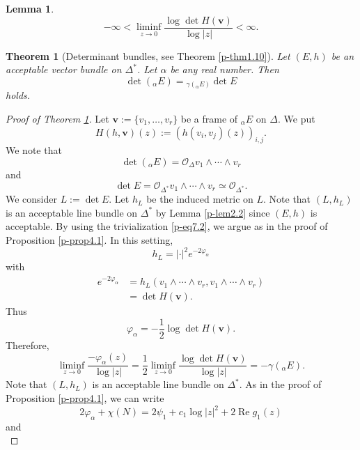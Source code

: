 \documentclass[10pt,a4paper]{amsart}
\newtheorem{thm}{Theorem}
\newtheorem{lem}{Lemma}
\DeclareMathOperator{\re}{Re}
\begin{document}
\begin{lem}\label{p-lem7.3}
\[
-\infty<\liminf _{z\to 0} \frac{\log \det H(\bm v)}{\log |z|}<\infty. 
\]
\end{lem}

\begin{thm}[Determinant bundles, see Theorem \ref{p-thm1.10}]\label{p-thm7.5}
Let $(E, h)$ be an acceptable vector bundle on $\Delta^*$. 
Let $\alpha$ be any real number. 
Then 
\[
\det ({}_\alpha E)={}_{\gamma ({}_\alpha E)} \det E
\] 
holds. 
\end{thm}

\begin{proof}[Proof of Theorem \ref{p-thm7.5}]
Let $\bm v:=\{v_1, \ldots, v_r\}$ be a frame of ${}_\alpha E$ on $\Delta$. 
We put 
\[
H(h, \bm v)(z):=\left(h(v_i, v_j)(z)\right)_{i, j}. 
\] 
We note that 
\[
\det ({}_\alpha E)=\mathcal O_\Delta v_1\wedge \cdots \wedge v_r
\] 
and 
\begin{equation}\label{p-eq7.2}
\det E=\mathcal O_{\Delta^*}v_1\wedge \cdots \wedge v_r\simeq 
\mathcal O_{\Delta^*}. 
\end{equation} 
We consider $L:=\det E$. Let $h_L$ be the induced metric on $L$. 
Note that $(L, h_L)$ is an acceptable line bundle on $\Delta^*$ 
by Lemma \ref{p-lem2.2} since $(E, h)$ is acceptable. 
By using the trivialization \eqref{p-eq7.2}, 
we argue as in the proof of Proposition \ref{p-prop4.1}. 
In this setting, 
\[
h_L=|\cdot |^2 e^{-2\varphi_\alpha}
\] 
with 
\begin{equation}\label{p-eq7.3}
\begin{split}
e^{-2\varphi_\alpha} &=h_L(v_1\wedge \cdots \wedge v_r, v_1\wedge \cdots \wedge v_r) 
\\&=\det H(\bm v). 
\end{split}
\end{equation} 
Thus 
\[
\varphi_\alpha=-\frac{1}{2} \log \det H(\bm v). 
\] 
Therefore, 
\begin{equation}\label{p-eq7.4}
\liminf_{z\to 0} \frac{-\varphi_\alpha(z)}{\log |z|} 
=\frac{1}{2} \liminf_{z\to 0} \frac{\log \det H(\bm v)}{\log |z|} 
=-\gamma ({}_\alpha E). 
\end{equation} 
Note that $(L, h_L)$ is an acceptable line bundle on $\Delta^*$. 
As in the proof of Proposition \ref{p-prop4.1}, we can write 
\begin{equation}\label{p-eq7.5}
2\varphi_\alpha +\chi (N)=2\psi_1+c_1\log |z|^2+2\re g_1(z)
\end{equation}
and 
\begin{equation}\label{p-eq7.6}

\end{equation}
\end{proof}
\end{document}
